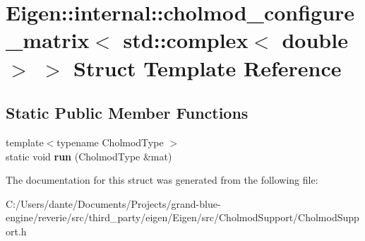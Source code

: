 \hypertarget{struct_eigen_1_1internal_1_1cholmod__configure__matrix_3_01std_1_1complex_3_01double_01_4_01_4}{}\section{Eigen\+::internal\+::cholmod\+\_\+configure\+\_\+matrix$<$ std\+::complex$<$ double $>$ $>$ Struct Template Reference}
\label{struct_eigen_1_1internal_1_1cholmod__configure__matrix_3_01std_1_1complex_3_01double_01_4_01_4}
\subsection*{Static Public Member Functions}
\begin{DoxyCompactItemize}
\item 
\mbox{\label{struct_eigen_1_1internal_1_1cholmod__configure__matrix_3_01std_1_1complex_3_01double_01_4_01_4_ab3560344879b16337d17862725beb787}} 
{\footnotesize template$<$typename Cholmod\+Type $>$ }\\static void {\bfseries run} (Cholmod\+Type \&mat)
\end{DoxyCompactItemize}


The documentation for this struct was generated from the following file\+:\begin{DoxyCompactItemize}
\item 
C\+:/\+Users/dante/\+Documents/\+Projects/grand-\/blue-\/engine/reverie/src/third\+\_\+party/eigen/\+Eigen/src/\+Cholmod\+Support/Cholmod\+Support.\+h\end{DoxyCompactItemize}

